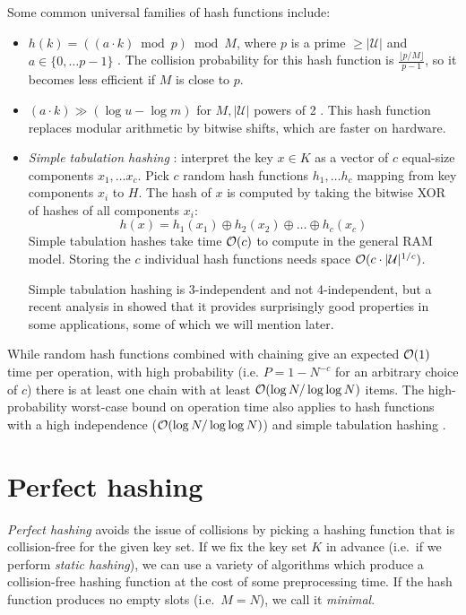 Some common universal families of hash functions include:
\begin{itemize}
\item $h(k)=((a\cdot k)\bmod p)\bmod M$, where $p$ is a prime
	$\geq|\mathcal{U}|$ and $a\in\{0,\ldots p-1\}$ \cite{univ-classes}.
	The collision probability for this hash function is
	$\frac{\lfloor p/M\rfloor}{p-1}$, so it becomes less efficient
	if $M$ is close to $p$.
\item $(a\cdot k)\gg(\log u-\log m)$ for $M, |\mathcal{U}|$ powers of 2
	\cite{dietzfelbinger}.
	This hash function replaces modular arithmetic by bitwise shifts,
	which are faster on hardware.
\item \emph{Simple tabulation hashing} \cite{univ-classes}:
	interpret the key $x\in K$ as a vector
	of $c$ equal-size components $x_1,\ldots x_c$. Pick $c$ random hash
	functions $h_1,\ldots h_c$ mapping from key components $x_i$ to $H$.
	The hash of $x$ is computed by taking the bitwise XOR
	of hashes of all components $x_i$:
	$$h(x)=h_1(x_1)\oplus h_2(x_2)\oplus \ldots \oplus h_c(x_c)$$
	Simple tabulation hashes take time $\mathcal{O}(c)$ to compute in the general RAM
	model. Storing the $c$ individual hash functions needs space
	$\mathcal{O}(c\cdot |\mathcal{U}|^{1/c})$.  %

	Simple tabulation hashing is 3-independent and not 4-independent,
	but a recent analysis in \cite{power-of-simple-tab} showed that
	it provides surprisingly good properties in some applications,
	some of which we will mention later.
\end{itemize}

While random hash functions combined with chaining give an expected $\mathcal{O}(1)$
time per operation, with high probability (i.e.  $P=1-N^{-c}$ for an arbitrary
choice of $c$) there is at least one chain with at least $\mathcal{O}(\log N/\log\log N)$
items. The high-probability worst-case bound on operation time also applies
to hash functions with a high independence ($\mathcal{O}(\log N/\log\log N)$)
\cite{chernoff-hoeffding-bounds} and simple tabulation
hashing \cite{power-of-simple-tab}.

\section{Perfect hashing}
\emph{Perfect hashing} avoids the issue of collisions by picking a hashing
function that is collision-free for the given key set. If we fix the key set
$K$ in advance (i.e.\ if we perform \emph{static hashing}), we can use
a variety of algorithms which produce a collision-free hashing function at
the cost of some preprocessing time. If the hash function produces no empty
slots (i.e.\ $M=N$), we call it \emph{minimal}.

